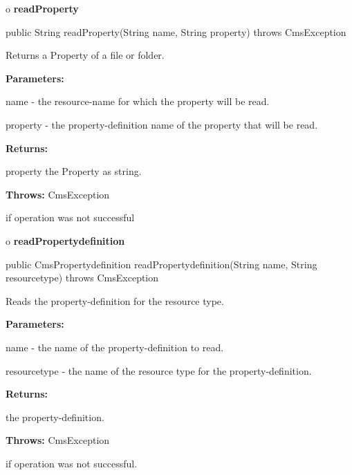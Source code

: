 o {\bf readProperty} 

\begin{PRE}
 public String readProperty(String name,
                            String property) throws CmsException
\end{PRE}

\begin{description}
\htmlDD Returns a Property of a file or folder. 

\begin{description}
\item {\bf Parameters:}  

name - the resource-name for which the property will be read.  

property - the property-definition name of the property that will be read.  
\item {\bf Returns:}  

property the Property as string.  
\item {\bf Throws:} CmsException  

if operation was not successful  
\end{description}

\end{description}

o {\bf readPropertydefinition} 

\begin{PRE}
 public CmsPropertydefinition readPropertydefinition(String name,
                                                     String resourcetype) throws CmsException
\end{PRE}

\begin{description}
\htmlDD Reads the property-definition for the resource type. 

\begin{description}
\item {\bf Parameters:}  

name - the name of the property-definition to read.  

resourcetype - the name of the resource type for the property-definition.  
\item {\bf Returns:}  

the property-definition.  
\item {\bf Throws:} CmsException  

if operation was not successful.  
\end{description}

\end{description}

